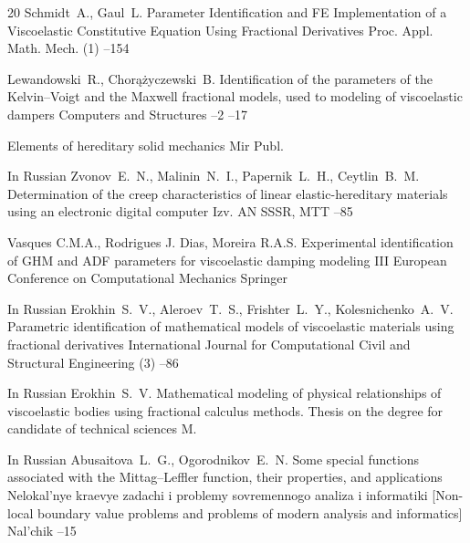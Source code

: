 \begin{thebibliography}{20}
\by Schmidt~A., Gaul~L.
\paper Parameter Identification and FE Implementation of a Viscoelastic Constitutive Equation Using Fractional Derivatives
\jour Proc. Appl. Math. Mech.
(1)
--154

\by Lewandowski~R., \Russian Chor\k{a}\.zyczewski~B.
\paper  Identification of the parameters of the Kelvin--Voigt and the Maxwell fractional models, used to modeling of viscoelastic dampers
\jour Computers and Structures
--2
--17

\book Elements of hereditary solid mechanics
\publaddr
\publ Mir Publ.


\lang In Russian
\by Zvonov~E.~N., Malinin~N.~I., Papernik~L.~H., Ceytlin~B.~M.
\paper Determination of the creep characteristics of linear elastic-hereditary materials using an electronic digital computer
\jour  Izv. AN SSSR, MTT
–85

\by Vasques C.M.A., Rodrigues J. Dias,  Moreira R.A.S.
\paper Experimental identification of GHM and ADF parameters for viscoelastic damping modeling
\inbook III European Conference on Computational Mechanics
\publ  Springer

\lang In Russian
\by Erokhin~S.~V., Aleroev~T.~S., Frishter~L.~Y., Kolesnichenko~A.~V.
\paper Parametric identification of mathematical models of viscoelastic
materials using fractional derivatives
\jour International Journal for Computational Civil and Structural Engineering
(3)
--86

\lang In Russian
\by Erokhin~S.~V.
\book Mathematical modeling of physical relationships of viscoelastic bodies using fractional calculus methods. Thesis on the degree for candidate of technical sciences
\publaddr M.



\lang In Russian
\by Abusaitova~L.~G., Ogorodnikov~E.~N.
\paper Some special functions associated with the Mittag--Leffler function, their properties, and applications
\inbook Nelokal'nye kraevye zadachi i problemy sovremennogo analiza i informatiki \rm [Non-local boundary value problems and problems of modern analysis and informatics]
\publaddr Nal'chik
--15



\end{thebibliography}
